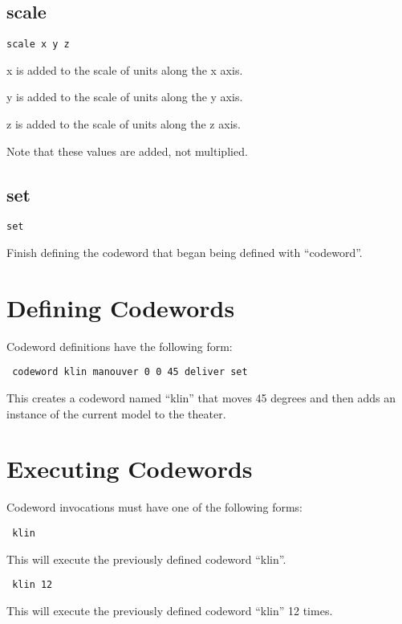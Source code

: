 \documentclass[12pt]{article}
\begin{document}
\subsection{scale}

\texttt{scale x y z}

x is added to the scale of units along the x axis.

y is added to the scale of units along the y axis.

z is added to the scale of units along the z axis.

Note that these values are added, not multiplied.

\subsection{set}

\texttt{set}

Finish defining the codeword that began being defined with ``codeword''.

\section{Defining Codewords}

Codeword definitions have the following form:

\texttt{
codeword klin
  manouver 0 0 45
  deliver
set
}

This creates a codeword named ``klin'' that moves 45 degrees and then adds an instance of the current model to the theater.

\section{Executing Codewords}

Codeword invocations must have one of the following forms:

\texttt{
klin
}

This will execute the previously defined codeword ``klin''.

\texttt{
klin 12
}

This will execute the previously defined codeword ``klin'' 12 times.
\end{document}
